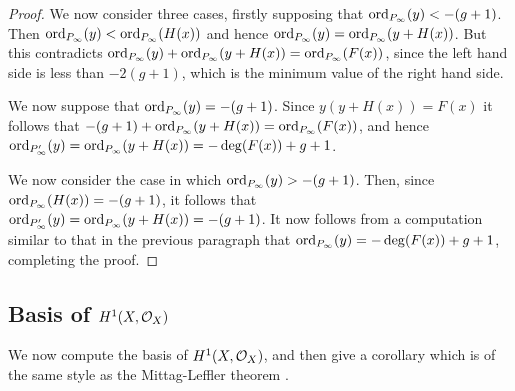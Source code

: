 \begin{proof}
    
    We now consider three cases, firstly supposing that $\operatorname{ord}_{P_\infty}(y) < -(g+1)$.
    Then $\operatorname{ord}_{P_\infty}(y) < \operatorname{ord}_{P_\infty}(H(x))$ and hence $ \operatorname{ord}_{P_\infty}(y) = \operatorname{ord}_{P_\infty}(y+H(x))$.
    But this contradicts $\operatorname{ord}_{P_\infty}(y) + \operatorname{ord}_{P_\infty}(y+H(x)) = \operatorname{ord}_{P_\infty}(F(x))$, since the left hand side is less than $-2(g+1)$, which is the minimum value of the right hand side.
    
    We now suppose that $\operatorname{ord}_{P_\infty} (y) = -(g+1)$. Since $y(y+H(x)) = F(x)$ it follows that $-(g+1) + \operatorname{ord}_{P_\infty}(y+H(x)) = \operatorname{ord}_{P_\infty}(F(x))$, and hence $\operatorname{ord}_{P_\infty'}(y) = \operatorname{ord}_{P_\infty}(y+H(x)) = -\deg(F(x)) + g + 1$.
    
    We now consider the case in which $\operatorname{ord}_{P_\infty}(y) > -(g+1)$.
    Then, since $\operatorname{ord}_{P_\infty}(H(x)) = -(g+1)$, it follows that $\operatorname{ord}_{P_\infty'}(y) = \operatorname{ord}_{P_\infty} (y+H(x)) = -(g+1)$.
    It now follows from a computation similar to that in the previous paragraph that $\operatorname{ord}_{P_\infty}(y) = -\deg(F(x)) + g +1$, completing the proof.
    \end{proof}

\subsection{Basis of $H^1(X,\mathcal{O}_X)$}

We now compute the basis of $H^1(X,\mathcal{O}_X)$, and then give a corollary which is of the same style as the Mittag-Leffler theorem \cite[Chap.\ 5, \S 2, Thm.\ 4]{ahlfors}.

